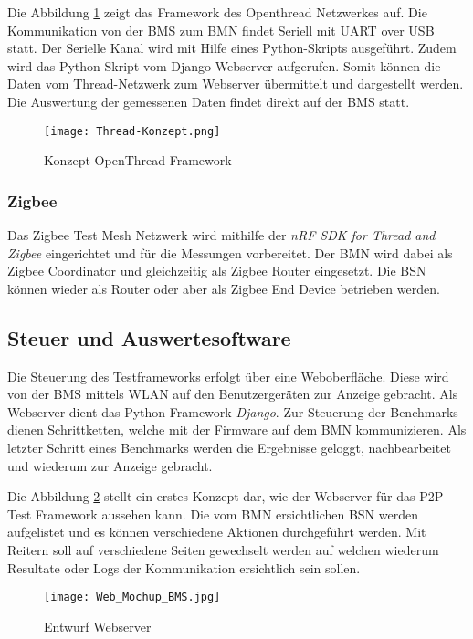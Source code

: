 Die Abbildung \ref{fig:ThreadKonzept} zeigt das Framework des Openthread Netzwerkes auf. Die Kommunikation von der BMS zum BMN findet Seriell mit UART over USB statt. Der Serielle Kanal wird mit Hilfe eines Python-Skripts ausgeführt. Zudem wird das Python-Skript vom Django-Webserver aufgerufen. Somit können die Daten vom Thread-Netzwerk zum Webserver übermittelt und dargestellt werden. Die Auswertung der gemessenen Daten findet direkt auf der BMS statt.
\begin{figure}[H]
	\centering
	\texttt{[image: Thread-Konzept.png]}
	\caption{Konzept OpenThread Framework}\label{fig:ThreadKonzept}
\end{figure}


\subsubsection{Zigbee}\label{subsubsection:Zigbee}
Das Zigbee Test Mesh Netzwerk wird mithilfe der \textit{nRF SDK for Thread and Zigbee} eingerichtet und für die Messungen vorbereitet. Der BMN wird dabei als Zigbee Coordinator und gleichzeitig als Zigbee Router eingesetzt. Die BSN können wieder als Router oder aber als Zigbee End Device betrieben werden.

\newpage
\subsection{Steuer und Auswertesoftware}\label{subsec:SteuerundAuswertesoftware}
Die Steuerung des Testframeworks erfolgt über eine Weboberfläche. Diese wird von der BMS mittels WLAN auf den Benutzergeräten zur Anzeige gebracht. Als Webserver dient das Python-Framework \textit{Django}. Zur Steuerung der Benchmarks dienen Schrittketten, welche mit der Firmware auf dem BMN kommunizieren. Als letzter Schritt eines Benchmarks werden die Ergebnisse geloggt, nachbearbeitet und wiederum zur Anzeige gebracht.

Die Abbildung \ref{fig:EntwurfWebserver} stellt ein erstes Konzept dar, wie der Webserver für das P2P Test Framework aussehen kann. Die vom BMN ersichtlichen BSN werden aufgelistet und es können verschiedene  Aktionen durchgeführt werden. Mit Reitern soll auf verschiedene Seiten gewechselt werden auf welchen wiederum Resultate oder Logs der Kommunikation ersichtlich sein sollen.

\begin{figure}[H]
	\centering
	\texttt{[image: Web\_Mochup\_BMS.jpg]}
	\caption{Entwurf Webserver}\label{fig:EntwurfWebserver}
\end{figure}

